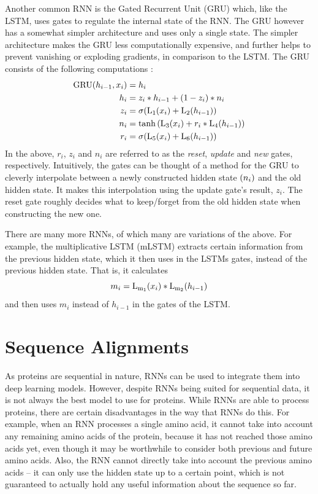 Another common RNN is the Gated Recurrent Unit (GRU) which, like the LSTM, uses gates to regulate the internal state of the RNN. The GRU however has a somewhat simpler architecture and uses only a single state. The simpler architecture makes the GRU less computationally expensive, and further helps to prevent vanishing or exploding gradients, in comparison to the LSTM. The GRU consists of the following computations \cite{pytorchnn}:
\begin{align*}
    \mathrm{GRU}{\mathopen{} \left( h_{i - 1}, x_i \right) \mathclose{}} &= h_i \\
    h_i &= z_i * h_{i - 1} + {\mathopen{} \left( 1 - z_i \right) \mathclose{}} * n_i  \\
    z_i &= \mathrm{\sigma}{\mathopen{} \left( \mathrm{L_1}{\mathopen{} \left( x_i \right) \mathclose{}} + \mathrm{L_2}{\mathopen{} \left( h_{i - 1} \right) \mathclose{}} \right) \mathclose{}} \\
    n_i &= \tanh{\mathopen{} \left( \mathrm{L_3}{\mathopen{} \left( x_i \right) \mathclose{}} + r_i * \mathrm{L_4}{\mathopen{} \left( h_{i - 1} \right) \mathclose{}} \right) \mathclose{}} \\
    r_i &= \mathrm{\sigma}{\mathopen{} \left( \mathrm{L_5}{\mathopen{} \left( x_i \right) \mathclose{}} + \mathrm{L_6}{\mathopen{} \left( h_{i - 1} \right) \mathclose{}} \right) \mathclose{}}
\end{align*}
In the above, $r_i$, $z_i$ and $n_i$ are referred to as the \textit{reset}, \textit{update} and \textit{new} gates, respectively. Intuitively, the gates can be thought of a method for the GRU to cleverly interpolate between a newly constructed hidden state ${\mathopen{} \left( n_i \right) \mathclose{}}$ and the old hidden state. It makes this interpolation using the update gate's result, $z_i$. The reset gate roughly decides what to keep/forget from the old hidden state when constructing the new one.

There are many more RNNs, of which many are variations of the above. For example, the multiplicative LSTM (mLSTM) \cite{krause2016multiplicative} extracts certain information from the previous hidden state, which it then uses in the LSTMs gates, instead of the previous hidden state. That is, it calculates
\[m_i = \mathrm{L_{m_1}}{\mathopen{} \left( x_i \right) \mathclose{}} * \mathrm{L_{m_2}}{\mathopen{} \left( h_{i - 1} \right) \mathclose{}}\]
and then uses $m_i$ instead of $h_{i - 1}$ in the gates of the LSTM.

\section{Sequence Alignments}
\label{sec:sequence_alignments}
As proteins are sequential in nature, RNNs can be used to integrate them into deep learning models. However, despite RNNs being suited for sequential data, it is not always the best model to use for proteins. While RNNs are able to process proteins, there are certain disadvantages in the way that RNNs do this. For example, when an RNN processes a single amino acid, it cannot take into account any remaining amino acids of the protein, because it has not reached those amino acids yet, even though it may be worthwhile to consider both previous and future amino acids. Also, the RNN cannot directly take into account the previous amino acids -- it can only use the hidden state up to a certain point, which is not guaranteed to actually hold any useful information about the sequence so far.

